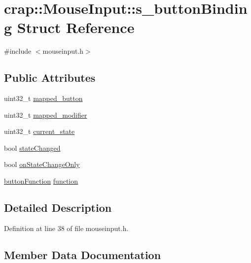 \hypertarget{structcrap_1_1_mouse_input_1_1s__button_binding}{}\section{crap\+:\+:Mouse\+Input\+:\+:s\+\_\+button\+Binding Struct Reference}
\label{structcrap_1_1_mouse_input_1_1s__button_binding}


{\ttfamily \#include $<$mouseinput.\+h$>$}

\subsection*{Public Attributes}
\begin{DoxyCompactItemize}
\item 
uint32\+\_\+t \hyperlink{structcrap_1_1_mouse_input_1_1s__button_binding_acd16a3ce0186973b469d69dd9ba1c4ca}{mapped\+\_\+button}
\item 
uint32\+\_\+t \hyperlink{structcrap_1_1_mouse_input_1_1s__button_binding_a7828977e7c16c4c4a8df06aa0c7f6491}{mapped\+\_\+modifier}
\item 
uint32\+\_\+t \hyperlink{structcrap_1_1_mouse_input_1_1s__button_binding_ad9f9c39dfdf90b3d3481838ae318dbe7}{current\+\_\+state}
\item 
bool \hyperlink{structcrap_1_1_mouse_input_1_1s__button_binding_ada0af7c411ba694b177864d3b617771c}{state\+Changed}
\item 
bool \hyperlink{structcrap_1_1_mouse_input_1_1s__button_binding_a2239fa91c7d78365c32be0148dddabcf}{on\+State\+Change\+Only}
\item 
\hyperlink{classcrap_1_1_mouse_input_ae29f008887cdeda02cb0a8bbac759f52}{button\+Function} \hyperlink{structcrap_1_1_mouse_input_1_1s__button_binding_a3a605333de8acc3dc5a42d23487760e7}{function}
\end{DoxyCompactItemize}


\subsection{Detailed Description}


Definition at line 38 of file mouseinput.\+h.



\subsection{Member Data Documentation}
\hypertarget{structcrap_1_1_mouse_input_1_1s__button_binding_ad9f9c39dfdf90b3d3481838ae318dbe7}{}
